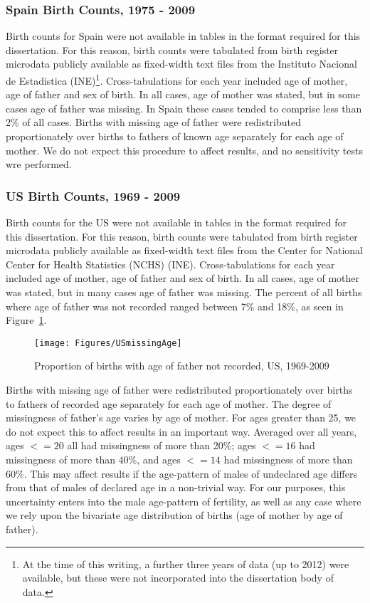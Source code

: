 

\subsubsection{Spain Birth Counts, 1975 - 2009}
Birth counts for Spain were not available in tables in the format required for
this dissertation. For this reason, birth counts were tabulated from birth
register microdata publicly available as fixed-width text files from the 
Instituto Nacional de Estadistica (INE)\citep{MNPnacimientos}\footnote{At the
time of this writing, a further three years of data (up to 2012) were available, but these were not
incorporated into the dissertation body of data.}. Cross-tabulations for each
year included age of mother, age of father and sex of birth. In all cases, age
of mother was stated, but in some cases age of father was missing. In Spain
these cases tended to comprise less than 2\% of all cases. Births with missing
age of father were redistributed proportionately over births to fathers of known
age separately for each age of mother. We do not expect this procedure to affect
results, and no sensitivity tests wre performed.

\subsubsection{US Birth Counts, 1969 - 2009}
Birth counts for the US were not available in tables in the format required for
this dissertation. For this reason, birth counts were tabulated from birth
register microdata publicly available as fixed-width text files from the 
Center for National Center for Health Statistics (NCHS)
(INE)\citep{NCHS19692009}. Cross-tabulations for each
year included age of mother, age of father and sex of birth. In all cases, age
of mother was stated, but in many cases age of father was missing. The
percent of all births where age of father was not recorded ranged between 7\%
and 18\%, as seen in Figure~\ref{fig:USmissingAge}. 

\begin{figure}[ht!]
        \centering  
          \caption{Proportion of births with age of father not recorded, US,
          1969-2009}
           \texttt{[image: Figures/USmissingAge]}
          \label{fig:USmissingAge}
\end{figure}

Births with missing age of father were redistributed
proportionately over births to fathers of recorded age separately for each
age of mother. The degree of missingness of father's age varies by age of
mother. For ages greater than 25, we do not expect this to affect results in an important
way. Averaged over all years, ages $<= 20$ all had missingness of more than
20\%; ages $<= 16$ had missingness of more than 40\%, and ages $<= 14$ had
missingness of more than 60\%. This may affect results if the age-pattern of
males of undeclared age differs from that of males of declared age in a
non-trivial way. For our purposes, this uncertainty enters into the male
age-pattern of fertility, as well as any case where we rely upon the bivariate
age distribution of births (age of mother by age of father). 

